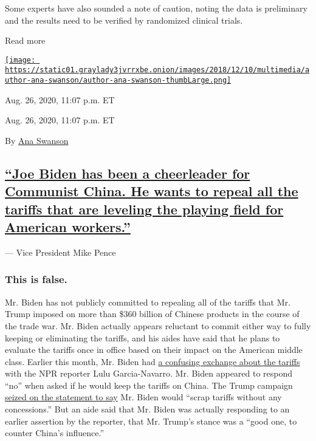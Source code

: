 Some experts have also sounded a note of caution, noting the data is
preliminary and the results need to be verified by randomized clinical
trials.

Read more

\href{https://www.nytimes3xbfgragh.onion/by/ana-swanson}{\texttt{[image: https://static01.graylady3jvrrxbe.onion/images/2018/12/10/multimedia/author-ana-swanson/author-ana-swanson-thumbLarge.png]}}

Aug. 26, 2020, 11:07 p.m. ET

Aug. 26, 2020, 11:07 p.m. ET

By \href{https://www.nytimes3xbfgragh.onion/by/ana-swanson}{Ana Swanson}

\hypertarget{joe-biden-has-been-a-cheerleader-for-communist-china-he-wants-to-repeal-all-the-tariffs-that-are-leveling-the-playing-field-for-american-workers}{%
\subsection{\texorpdfstring{\protect\hyperlink{joe-biden-has-been-a-cheerleader-for-communist-china-he-wants-to-repeal-all-the-tariffs-that-are-leveling-the-playing-field-for-}{``Joe
Biden has been a cheerleader for Communist China. He wants to repeal all
the tariffs that are leveling the playing field for American
workers.''}}{``Joe Biden has been a cheerleader for Communist China. He wants to repeal all the tariffs that are leveling the playing field for American workers.''}}\label{joe-biden-has-been-a-cheerleader-for-communist-china-he-wants-to-repeal-all-the-tariffs-that-are-leveling-the-playing-field-for-american-workers}}

--- Vice President Mike Pence

\hypertarget{this-is-false}{%
\subsubsection{\texorpdfstring{\textbf{This is
false.}}{This is false.}}\label{this-is-false}}

Mr. Biden has not publicly committed to repealing all of the tariffs
that Mr. Trump imposed on more than \$360 billion of Chinese products in
the course of the trade war. Mr. Biden actually appears reluctant to
commit either way to fully keeping or eliminating the tariffs, and his
aides have said that he plans to evaluate the tariffs once in office
based on their impact on the American middle class. Earlier this month,
Mr. Biden had
\href{https://slack-redir.net/link?url=https\%3A\%2F\%2Fnews.yahoo.com\%2Fsaid-trumps-ideas-good-one-153901834.html}{a
confusing exchange about the tariffs} with the NPR reporter Lulu
Garcia-Navarro. Mr. Biden appeared to respond ``no'' when asked if he
would keep the tariffs on China. The Trump campaign
\href{https://slack-redir.net/link?url=https\%3A\%2F\%2Fwww.donaldjtrump.com\%2Fmedia\%2Fjoe-biden-says-hell-surrender-to-china-on-trade-scrap-tariffs-without-any-concessions\%2F}{seized
on the statement to say} Mr. Biden would ``scrap tariffs without any
concessions.'' But an aide said that Mr. Biden was actually responding
to an earlier assertion by the reporter, that Mr. Trump's stance was a
``good one, to counter China's influence.''

